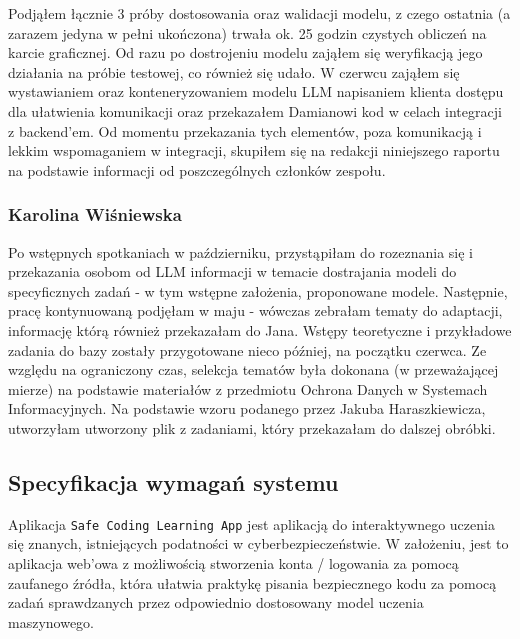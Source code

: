 \documentclass[12pt,a4paper]{article}
\begin{document}
Podjąłem łącznie 3 próby dostosowania oraz walidacji modelu, z czego ostatnia (a zarazem jedyna w pełni ukończona) trwała ok. 25 godzin czystych obliczeń na karcie graficznej. Od razu po dostrojeniu modelu zająłem się weryfikacją jego działania na próbie testowej, co również się udało. W czerwcu zająłem się wystawianiem oraz konteneryzowaniem modelu LLM napisaniem klienta dostępu dla ułatwienia komunikacji oraz przekazałem Damianowi kod w celach integracji z backend'em. Od momentu przekazania tych elementów, poza komunikacją i lekkim wspomaganiem w integracji, skupiłem się na redakcji niniejszego raportu na podstawie informacji od poszczególnych członków zespołu.


\subsubsection*{Karolina Wiśniewska}
Po wstępnych spotkaniach w październiku, przystąpiłam do rozeznania się i przekazania osobom od LLM informacji w temacie dostrajania modeli do specyficznych zadań - w tym wstępne założenia, proponowane modele. Następnie, pracę kontynuowaną podjęłam w maju - wówczas zebrałam tematy do adaptacji, informację którą również przekazałam do Jana. Wstępy teoretyczne i przykładowe zadania do bazy zostały przygotowane nieco później, na początku czerwca. Ze względu na ograniczony czas, selekcja tematów była dokonana (w przeważającej mierze) na podstawie materiałów z przedmiotu Ochrona Danych w Systemach Informacyjnych. Na podstawie wzoru podanego przez Jakuba Haraszkiewicza, utworzyłam utworzony plik z zadaniami, który przekazałam do dalszej obróbki.


\subsection{Specyfikacja wymagań systemu}
Aplikacja \texttt{Safe Coding Learning App} jest aplikacją do interaktywnego uczenia się znanych, istniejących podatności w cyberbezpieczeństwie. W założeniu, jest to aplikacja web'owa z możliwością stworzenia konta / logowania za pomocą zaufanego źródła, która ułatwia praktykę pisania bezpiecznego kodu za pomocą zadań sprawdzanych przez odpowiednio dostosowany model uczenia maszynowego.
\end{document}
